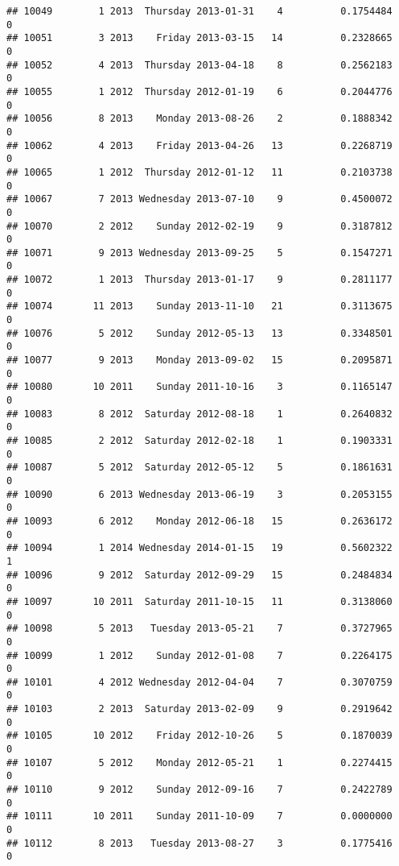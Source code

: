 \documentclass[
]{article}
\begin{document}
\begin{verbatim}
## 10049        1 2013  Thursday 2013-01-31    4          0.1754484             0
## 10051        3 2013    Friday 2013-03-15   14          0.2328665             0
## 10052        4 2013  Thursday 2013-04-18    8          0.2562183             0
## 10055        1 2012  Thursday 2012-01-19    6          0.2044776             0
## 10056        8 2013    Monday 2013-08-26    2          0.1888342             0
## 10062        4 2013    Friday 2013-04-26   13          0.2268719             0
## 10065        1 2012  Thursday 2012-01-12   11          0.2103738             0
## 10067        7 2013 Wednesday 2013-07-10    9          0.4500072             0
## 10070        2 2012    Sunday 2012-02-19    9          0.3187812             0
## 10071        9 2013 Wednesday 2013-09-25    5          0.1547271             0
## 10072        1 2013  Thursday 2013-01-17    9          0.2811177             0
## 10074       11 2013    Sunday 2013-11-10   21          0.3113675             0
## 10076        5 2012    Sunday 2012-05-13   13          0.3348501             0
## 10077        9 2013    Monday 2013-09-02   15          0.2095871             0
## 10080       10 2011    Sunday 2011-10-16    3          0.1165147             0
## 10083        8 2012  Saturday 2012-08-18    1          0.2640832             0
## 10085        2 2012  Saturday 2012-02-18    1          0.1903331             0
## 10087        5 2012  Saturday 2012-05-12    5          0.1861631             0
## 10090        6 2013 Wednesday 2013-06-19    3          0.2053155             0
## 10093        6 2012    Monday 2012-06-18   15          0.2636172             0
## 10094        1 2014 Wednesday 2014-01-15   19          0.5602322             1
## 10096        9 2012  Saturday 2012-09-29   15          0.2484834             0
## 10097       10 2011  Saturday 2011-10-15   11          0.3138060             0
## 10098        5 2013   Tuesday 2013-05-21    7          0.3727965             0
## 10099        1 2012    Sunday 2012-01-08    7          0.2264175             0
## 10101        4 2012 Wednesday 2012-04-04    7          0.3070759             0
## 10103        2 2013  Saturday 2013-02-09    9          0.2919642             0
## 10105       10 2012    Friday 2012-10-26    5          0.1870039             0
## 10107        5 2012    Monday 2012-05-21    1          0.2274415             0
## 10110        9 2012    Sunday 2012-09-16    7          0.2422789             0
## 10111       10 2011    Sunday 2011-10-09    7          0.0000000             0
## 10112        8 2013   Tuesday 2013-08-27    3          0.1775416             0

\end{verbatim}
\end{document}
